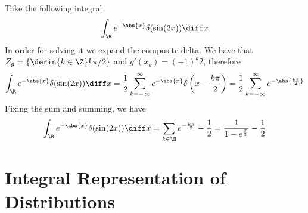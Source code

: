 \documentclass[../mmf.tex]{subfiles}
\begin{document}
\begin{eg}
	Take the following integral
	\begin{equation*}
		\int_{\R}^{}e^{-\abs{x}}\delta(\sin(2x))\diff x
	\end{equation*}
	In order for solving it we expand the composite delta. We have that $Z_g=\left\{\derin{k\in\Z} k\pi/2 \right\}$ and $g'(x_k)=(-1)^k2$, therefore
	\begin{equation*}
		\int_{\R}^{}e^{-\abs{x}}\delta(\sin(2x))\diff x=\frac{1}{2}\sum_{k=-\infty}^\infty e^{-\abs{x}}\delta\left( x-\frac{k\pi}{2} \right)=\frac{1}{2}\sum_{k=-\infty}^{\infty}e^{-\abs{\frac{k\pi}{2}}}
	\end{equation*}
	Fixing the sum and summing, we have
	\begin{equation*}
		\int_{\R}^{}e^{-\abs{x}}\delta(\sin(2x))\diff x=\sum_{k\in\N}^{}e^{-\frac{k\pi}{2}}-\frac{1}{2}=\frac{1}{1-e^{\frac{\pi}{2}}}-\frac{1}{2}
	\end{equation*}
\end{eg}
\section{Integral Representation of Distributions}
\end{document}
